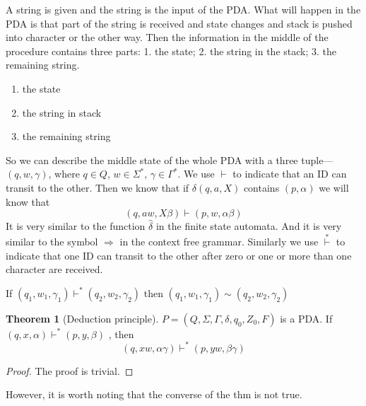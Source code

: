 \documentclass[12pt]{article}
\theoremstyle{definition}
\newtheorem{thm}[definition]{Theorem}
\theoremstyle{remark}
\begin{document}
A string is given and the string is the 
input of the PDA. What will happen in the PDA is that part of 
the string is received and state changes and stack is pushed into 
character or the other way. Then the information in the middle of 
the procedure contains three parts: 1. the state; 2. the string in 
the stack; 3. the remaining string. 
\begin{enumerate}
\item the state
\item the string in stack
\item the remaining string
\end{enumerate}
So we can describe the middle state of the whole PDA with a three 
tuple---\((q, w ,\gamma)\), where \(q \in Q\), \( w\in \Sigma ^{*} \), \(\gamma \in \Gamma ^{*}\). We use \(\vdash\) to indicate that 
an ID can transit to the other. Then we know that if \(\delta (q , a , X )\) contains \( ( p ,\alpha)\) we will know that 
\[
	(q , a w , X\beta ) \vdash ( p , w ,\alpha \beta )
\]
It is very similar to the function \( \hat\delta\) in the finite state automata. And it is very similar to the symbol \( \Rightarrow\)
in the context free grammar.   Similarly we use \( \overset{*}{\vdash}\) to indicate that one ID can transit to the other after zero or one or more
than one character are received. 

If \((q_{1} , w_{1} ,\gamma _{1}) \vdash ^{*} (q_{2}, w_2,\gamma_2)\) then
\((q_{1} , w_{1} ,\gamma _{1}) \sim (q_{2}, w_2,\gamma_2)\)


\begin{thm}[Deduction principle]
\label{Deduction principle}
	\(P  = ( Q , \Sigma , \Gamma ,\delta , q _{0}, Z _{0}, F)\)
	is a PDA. If \((q , x ,\alpha )\vdash ^{*} ( p, y  ,\beta)\) , then 
	\[
		(q,  x w ,\alpha \gamma ) \vdash ^{*} (p , y w, \beta \gamma)
	\]
\end{thm}

\begin{proof}
The proof is trivial. 
\end{proof}
However, it is worth noting that the converse of the thm is not 
true. 

\end{document}
